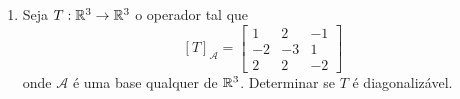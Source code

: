 \begin{exemplo}
\begin{enumerate}
\begin{solucao}
\begin{itemize}
				\[
					\begin{bmatrix}
						0 & -3 & -4\\
						0 & 0 & 5\\
						0 & 0 & -2
					\end{bmatrix}\begin{bmatrix}
						x\\y\\z
					\end{bmatrix} = \begin{bmatrix}
						0\\0\\0
					\end{bmatrix}.
				\]
				Assim
				\[
					\aut_T(3) = \{(x,0,0) \mid x \in \real\} = [(1,0,0)]
				\]
				e ent\~ao $\mathcal{B}_1 = \{(1,0,0)\}$ \'e uma base de $\aut_T(3)$ e $\dim_\real\aut_T(3) = 1$.
				\item Para $\lambda_2 = 1$ temos que $(x,y,z) \in \aut_T(1)$ se, e s\'o se,
				\[
					\begin{bmatrix}
						2 & -3 & -4\\
						0 & 2 & 5\\
						0 & 0 & 0
					\end{bmatrix}\begin{bmatrix}
						x\\y\\z
					\end{bmatrix} = \begin{bmatrix}
						0\\0\\0
					\end{bmatrix}.
				\]
				Assim
				\[
					\aut_T(1) = \{(-7z/4,-5z/2,z) \mid z \in \real\} = [(-7/4,-5/2,1)]
				\]
				e ent\~ao $\mathcal{B}_2 = \{(-7/4,-5/2,1)\}$ \'e uma base de $\aut_T(1)$ e $\dim_\real\aut_T(1) = 1$.
			\end{itemize}
			Note que o conjunto $\mathcal{B} = \mathcal{B}_1 \cup \mathcal{B}_2$ \'e L.I. mas n\~ao \'e uma base de $\real^3$. Neste caso o operador $T$ n\~ao \'e diagonaliz\'avel.
		\end{solucao}
		\item Seja $T : \mathbb{R}^3 \to \mathbb{R}^3$ o operador tal que
		\[
			[T]_\mathcal{A} = \begin{bmatrix}
								1 & 2 & -1\\
								-2 & -3 & 1\\
								2 & 2 & -2
							\end{bmatrix}
		\]
		onde $\mathcal{A}$ \'e uma base qualquer de $\real^3$. Determinar se $T$ \'e diagonaliz\'avel.

\end{enumerate}
\end{exemplo}
